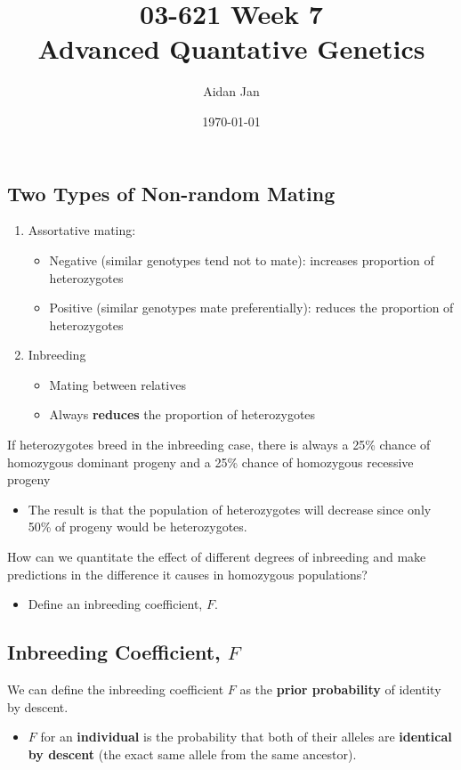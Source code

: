 \documentclass[10pt]{article}
\title{03-621 Week 7 \\ \large{Advanced Quantative Genetics}}
\author{Aidan Jan}
\date{\today}
\begin{document}
\maketitle

\subsection*{Two Types of Non-random Mating}
\begin{enumerate}
	\item Assortative mating:
	\begin{itemize}
	    \item Negative (similar genotypes tend not to mate): increases proportion of heterozygotes
	    \item Positive (similar genotypes mate preferentially): reduces the proportion of heterozygotes
    \end{itemize}
	\item Inbreeding
	\begin{itemize}
	    \item Mating between relatives
	    \item Always \textbf{reduces} the proportion of heterozygotes
    \end{itemize}
\end{enumerate}

If heterozygotes breed in the inbreeding case, there is always a 25\% chance of homozygous dominant progeny and a 25\% chance of homozygous recessive progeny
\begin{itemize}
	\item The result is that the population of heterozygotes will decrease since only 50\% of progeny would be heterozygotes.
\end{itemize}
How can we quantitate the effect of different degrees of inbreeding and make predictions in the difference it causes in homozygous populations?
\begin{itemize}
	\item Define an inbreeding coefficient, $F$.
\end{itemize}

\subsection*{Inbreeding Coefficient, $F$}
We can define the inbreeding coefficient $F$ as the \textbf{prior probability} of identity by descent.
\begin{itemize}
	\item $F$ for an \textbf{individual} is the probability that both of their alleles are \textbf{identical by descent} (the exact same allele from the same ancestor).
\end{itemize}
\end{document}
